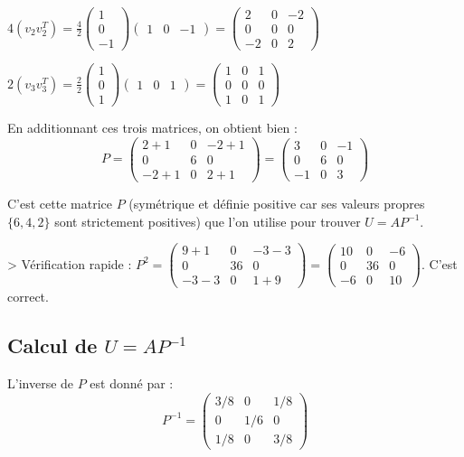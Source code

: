 \documentclass[french]{yLectureNote}
\begin{document}
   $4(v_2 v_2^T) = \frac{4}{2} \begin{pmatrix} 1 \\ 0 \\ -1 \end{pmatrix} \begin{pmatrix} 1 & 0 & -1 \end{pmatrix} = \begin{pmatrix} 2 & 0 & -2 \\ 0 & 0 & 0 \\ -2 & 0 & 2 \end{pmatrix}$

   $2(v_3 v_3^T) = \frac{2}{2} \begin{pmatrix} 1 \\ 0 \\ 1 \end{pmatrix} \begin{pmatrix} 1 & 0 & 1 \end{pmatrix} = \begin{pmatrix} 1 & 0 & 1 \\ 0 & 0 & 0 \\ 1 & 0 & 1 \end{pmatrix}$

En additionnant ces trois matrices, on obtient bien :
$$P = \begin{pmatrix} 2+1 & 0 & -2+1 \\ 0 & 6 & 0 \\ -2+1 & 0 & 2+1 \end{pmatrix} = \begin{pmatrix} 3 & 0 & -1 \\ 0 & 6 & 0 \\ -1 & 0 & 3 \end{pmatrix}$$

C'est cette matrice $P$ (symétrique et définie positive car ses valeurs propres $\{6, 4, 2\}$ sont strictement positives) que l'on utilise pour trouver $U = AP^{-1}$.

> Vérification rapide : $P^2 = \begin{pmatrix} 9+1 & 0 & -3-3 \\ 0 & 36 & 0 \\ -3-3 & 0 & 1+9 \end{pmatrix} = \begin{pmatrix} 10 & 0 & -6 \\ 0 & 36 & 0 \\ -6 & 0 & 10 \end{pmatrix}$. C'est correct.

\subsection{Calcul de $U = AP^{-1}$}
L'inverse de $P$ est donné par :
$$P^{-1} = \begin{pmatrix} 3/8 & 0 & 1/8 \\ 0 & 1/6 & 0 \\ 1/8 & 0 & 3/8 \end{pmatrix}$$
\end{document}
